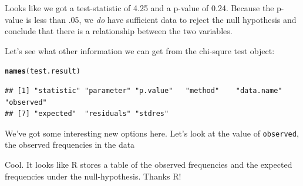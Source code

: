\documentclass{tufte-book}\usepackage[]{graphicx}\usepackage[]{color}
\makeatletter
\newcommand{\hlopt}[1]{\textcolor[rgb]{0,0,0}{#1}}%
\newcommand{\hlstd}[1]{\textcolor[rgb]{0.345,0.345,0.345}{#1}}%
\newcommand{\hlkwd}[1]{\textcolor[rgb]{0.737,0.353,0.396}{\textbf{#1}}}%
\newenvironment{kframe}{%
 \def\at@end@of@kframe{}%
 \ifinner\ifhmode%
  \def\at@end@of@kframe{\end{minipage}}%
  \begin{minipage}{\columnwidth}%
 \fi\fi%
 \def\FrameCommand##1{\hskip\@totalleftmargin \hskip-\fboxsep
 \colorbox{shadecolor}{##1}\hskip-\fboxsep
     \hskip-\linewidth \hskip-\@totalleftmargin \hskip\columnwidth}%
 \MakeFramed {\advance\hsize-\width
   \@totalleftmargin\z@ \linewidth\hsize
   \@setminipage}}%
 {\par\unskip\endMakeFramed%
 \at@end@of@kframe}
\newenvironment{knitrout}{}{} %
\makeatother
\begin{document}
\begin{footnotesize}
Looks like we got a test-statistic of 4.25 and a p-value of 0.24. Because the p-value is less than .05, we \textit{do} have sufficient data to reject the null hypothesis and conclude that there is a relationship between the two variables.

Let's see what other information we can get from the chi-squre test object:


\begin{footnotesize}
\begin{knitrout}
\color{fgcolor}\begin{kframe}
\begin{alltt}
\hlkwd{names}\hlstd{(test.result)}
\end{alltt}
\begin{verbatim}
## [1] "statistic" "parameter" "p.value"   "method"    "data.name" "observed" 
## [7] "expected"  "residuals" "stdres"
\end{verbatim}
\end{kframe}
\end{knitrout}
\end{footnotesize}

We've got some interesting new options here. Let's look at the value of \texttt{observed}, the observed frequencies in the data


Cool. It looks like R stores a table of the observed frequencies and the expected frequencies under the null-hypothesis. Thanks R!





\end{footnotesize}
\end{document}
